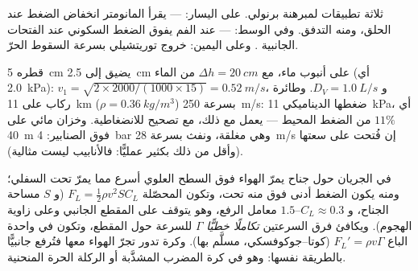 \begin{omfigure}

{\small ثلاثة تطبيقات لمبرهنة برنولي. على اليسار:  --- يقرأ المانومتر انخفاض الضغط عند الحلق، ومنه التدفق.
وفي الوسط:  ---  عند الفم يفوق الضغط
السكوني عند الفتحات الجانبية . وعلى اليمين:
خروج توريتشيلي بسرعة السقوط الحرّ.}
\end{omfigure}

\begin{example}\label{ex:b2:euler-bernoulli:numbers}
 قطره \qty{5}{cm} يضيق إلى \qty{2.5}{cm} على أنبوب ماء،
مع $\Delta h = \qty{20}{cm}$ من الماء (أي \qty{2.0}{kPa}): $v_1 = \sqrt{2 \times 2000/
(1000 \times 15)} = \qty{0.52}{m/s}$، و $D_V = \qty{1.0}{L/s}$. وطائرة ركاب على
\qty{11}{km} ($\rho = \qty{0.36}{kg/m^3}$) بسرعة \qty{250}{m/s}: ضغطها الديناميكي
\qty{11}{kPa}، أي $11\%$ من الضغط المحيط ---  يعمل
مع ذلك، مع تصحيح للانضغاطية. وخزان مائي على \qty{40}{m}
فوق الصنابير: \qty{4}{bar} وهي مغلقة، ونفث بسرعة \qty{28}{m/s} إن فُتحت
على سعتها (وأقل من ذلك بكثير عمليًّا: فالأنابيب ليست مثالية).
\end{example}

\begin{proposition}\label{prop:b2:euler-bernoulli:lift}
في الجريان حول جناح يمرّ الهواء فوق السطح العلوي أسرع مما
يمرّ تحت السفلي؛ ومنه يكون الضغط أدنى فوق منه تحت، وتكون
المحصّلة \emph{} $F_L =
\tfrac12\rho v^2SC_L$ (و $S$ مساحة الجناح، و $C_L \approx 0.3$--$1.5$ معامل
الرفع، وهو يتوقف على المقطع الجانبي وعلى زاوية الهجوم). ويكافئ
فرق السرعتين \emph{تكاملًا خطيًّا} $\Gamma$ للسرعة حول المقطع،
وتكون  في واحدة الباع $F_L' =
\rho v\Gamma$ (كوتا--جوكوفسكي، مسلَّم بها). وكرة تدور تجرّ الهواء
معها فتُرفع جانبيًّا بالطريقة نفسها: وهو \emph{} في
كرة المضرب المشذَّبة أو الركلة الحرة المنحنية.
\end{proposition}

